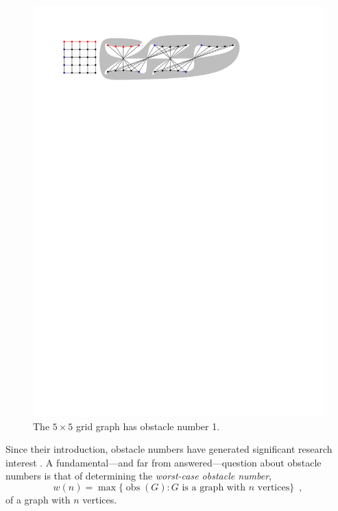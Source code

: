 \documentclass{patmorin}
\DeclareMathOperator{\obs}{obs}
\begin{document}
\begin{figure}[hbpt]
  \begin{center}
    \includegraphics{fivebyfive}
  \end{center}  
  \caption{The $5\times 5$ grid graph has obstacle number 1.}
\end{figure}

Since their introduction, obstacle numbers have generated significant
research interest 
\cite{%
   fulek.saeedi:convex,%
   johnson.sarioz:computing,%
   mukkamala.pach.ea:lower,%
   mukkamala.pach.ea:graphs,%
   pach.sarioz:small,%
   pach.sarioz:on,%
   sarioz:approximating%
}.
A fundamental---and far from answered---question about obstacle numbers
is that of determining the \emph{worst-case obstacle number},
\[
    w(n) = \max \{\obs(G) :\mbox{$G$ is a graph with $n$ vertices}\}
    \enspace ,
\] 
of a graph with $n$ vertices.
\end{document}
